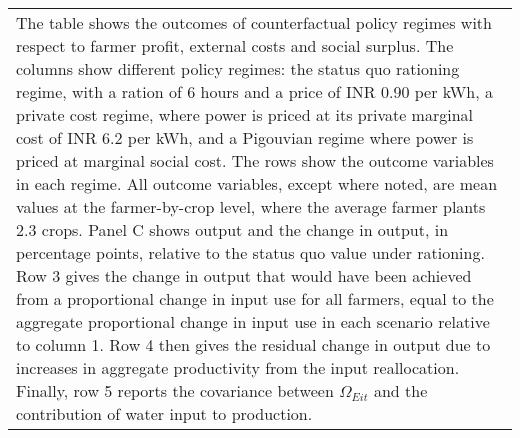 \begin{table}[!ht]
\begin{tabular}{lrrrr}
\multicolumn{5}{p{0.85\hsize}}{\footnotesize The table shows the outcomes of counterfactual policy regimes with respect to farmer profit, external costs and social surplus. The columns show different policy regimes: the status quo rationing regime, with a ration of 6 hours and a price of INR 0.90 per kWh, a private cost regime, where power is priced at its private marginal cost of INR 6.2 per kWh, and a Pigouvian regime where power is priced at marginal social cost. The rows show the outcome variables in each regime. All outcome variables, except where noted, are mean values at the farmer-by-crop level, where the average farmer plants 2.3 crops. Panel C shows output and the change in output, in percentage points, relative to the status quo value under rationing. Row 3 gives the change in output that would have been achieved from a proportional change in input use for all farmers, equal to the aggregate proportional change in input use in each scenario relative to column 1. Row 4 then gives the residual change in output due to increases in aggregate productivity from the input reallocation. Finally, row 5 reports the covariance between $\Omega_{Eit}$ and the contribution of water input to production.} \\
	\end{tabular}
\end{table}
